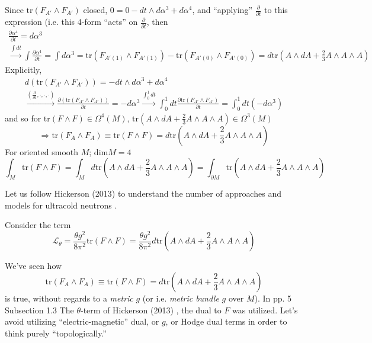 \documentclass[10pt]{amsart}
\begin{document}
\begin{multicols}{2}
Since $\text{tr}(F_{A'} \wedge F_{A'})$ closed, $0 = 0 - dt \wedge d\alpha^3 + d\alpha^4$, and ``applying'' $\frac{ \partial }{ \partial t}$ to this expression (i.e. this 4-form ``acts'' on $\frac{ \partial }{ \partial t}$, then 
\[
\begin{gathered}
  \frac{ \partial \alpha^4}{ \partial t} = d\alpha^3 \\ 
\xrightarrow{ \int dt } \int \frac{ \partial \alpha^4}{ \partial t} = \int d\alpha^3 = \text{tr}(F_{A'(1)} \wedge F_{A'(1)} ) - \text{tr}(F_{A'(0)} \wedge F_{A'(0) } ) = d\text{tr}(A\wedge dA + \frac{2}{3} A \wedge A \wedge A)
\end{gathered}
\]
Explicitly,
\[
\begin{gathered}
  d(\text{tr}(F_{A'} \wedge F_{A'}) ) = -dt \wedge d\alpha^3 + d\alpha^4 \\ 
  \xrightarrow{ \left( \frac{ \partial }{ \partial t} , \cdot, \cdot, \cdot \right) } \frac{ \partial ( \text{tr}(F_{A'} \wedge F_{A'} ) ) }{ \partial t} = - d\alpha^3 \xrightarrow{ \int_0^1 dt } \int_0^1 dt \frac{ \partial \text{tr}( F_{A'} \wedge F_{A'})}{ \partial t} = \int_0^1 dt ( -d\alpha^3)
\end{gathered}
\]
and so for $\text{tr}(F\wedge F) \in \Omega^4(M)$, $\text{tr}(A \wedge dA + \frac{2}{3} A \wedge A \wedge A) \in \Omega^3(M)$
\begin{equation}
\Longrightarrow \boxed{ \text{tr}(F_A \wedge F_A) \equiv \text{tr}(F\wedge F) = d\text{tr}(A \wedge dA + \frac{2}{3} A \wedge A \wedge A ) }
\end{equation}
For oriented smooth $M$; $\text{dim}M=4$
\[
\int_M \text{tr}(F\wedge F)= \int_M d\text{tr}(A \wedge dA + \frac{2}{3} A \wedge A \wedge A ) = \int_{\partial M} \text{tr}(A \wedge dA + \frac{2}{3} A \wedge A \wedge A)
\]




Let us follow Hickerson (2013) \cite{Hick2013} to understand the number of approaches and models for ultracold neutrons \cite{Hick2013}.  

Consider the term
\[
\mathcal{L}_{\theta} = \frac{ \theta g^2}{ 8 \pi^2 } \text{tr}(F\wedge F) = \frac{ \theta g^2}{8 \pi^2} d\text{tr}( A \wedge dA + \frac{2}{3} A \wedge A \wedge A)
\]

We've seen how 
\begin{equation}
  \text{tr}(F_A \wedge F_A) \equiv \text{tr}(F\wedge F) = d\text{tr}(A \wedge dA + \frac{2}{3} A \wedge A \wedge A )
\end{equation}
is true, without regards to a \emph{metric} $g$ (or i.e. \emph{metric bundle} $g$ over $M$).  In pp. 5 Subsection 1.3 The $\theta$-term of Hickerson (2013) \cite{Hick2013}, the dual to $F$ was utilized.  Let's avoid utilizing ``electric-magnetic'' dual, or $g$, or Hodge dual terms in order to think purely ``topologically.''



\end{multicols}
\end{document}
